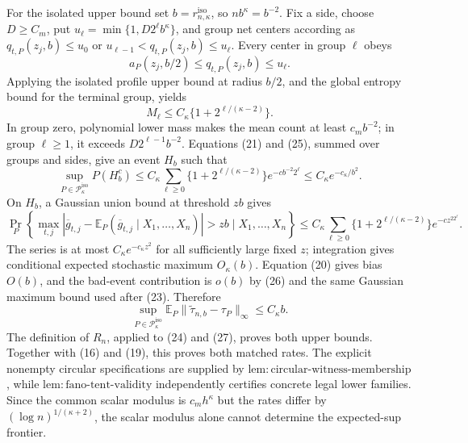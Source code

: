 For the isolated upper bound set \(b=r_{n,\kappa}^{\mathrm{iso}}\), so \(nb^{\kappa}=b^{-2}\).  Fix a side, choose \(D\ge C_m\), put \(u_{\ell}=\min\{1,D2^{\ell}b^{\kappa}\}\), and group net centers according as \(q_{t,P}(z_j,b)\le u_0\) or \(u_{\ell-1}<q_{t,P}(z_j,b)\le u_{\ell}\).  Every center in group \(\ell\) obeys
\[
 a_P(z_j,b/2)\le q_{t,P}(z_j,b)\le u_{\ell}.
\]
Applying the isolated profile upper bound at radius \(b/2\), and the global entropy bound for the terminal group, yields
\[
 M_{\ell}\le C_{\kappa}\{1+2^{\ell/(\kappa-2)}\}. \tag{25}
\]
In group zero, polynomial lower mass makes the mean count at least \(c_mb^{-2}\); in group \(\ell\ge1\), it exceeds \(D2^{\ell-1}b^{-2}\).  Equations (21) and (25), summed over groups and sides, give an event \(H_b\) such that
\[
 \sup_{P\in\mathcal P_{\kappa}^{\mathrm{iso}}}P(H_b^c)
 \le C_{\kappa}\sum_{\ell\ge0}\{1+2^{\ell/(\kappa-2)}\}e^{-cb^{-2}2^{\ell}}
 \le C_{\kappa}e^{-c_{\kappa}/b^2}. \tag{26}
\]
On \(H_b\), a Gaussian union bound at threshold \(zb\) gives
\[
 \Pr_P\left\{
 \max_{t,j}|\overline g_{t,j}-\mathbb E_P(\overline g_{t,j}\mid X_1,\ldots,X_n)|>zb
 \mid X_1,\ldots,X_n\right\}
 \le C_{\kappa}\sum_{\ell\ge0}\{1+2^{\ell/(\kappa-2)}\}e^{-cz^22^{\ell}}.
\]
The series is at most \(C_{\kappa}e^{-c_{\kappa}z^2}\) for all sufficiently large fixed \(z\); integration gives conditional expected stochastic maximum \(O_{\kappa}(b)\).  Equation (20) gives bias \(O(b)\), and the bad-event contribution is \(o(b)\) by (26) and the same Gaussian maximum bound used after (23).  Therefore
\[
 \sup_{P\in\mathcal P_{\kappa}^{\mathrm{iso}}}
 \mathbb E_P\|\widetilde\tau_{n,b}-\tau_P\|_{\infty}
 \le C_{\kappa}b. \tag{27}
\]
The definition of \(R_n\), applied to (24) and (27), proves both upper bounds.  Together with (16) and (19), this proves both matched rates.  The explicit nonempty circular specifications are supplied by \(\mathrm{lem:circular\text{-}witness\text{-}membership}\), while \(\mathrm{lem:fano\text{-}tent\text{-}validity}\) independently certifies concrete legal lower families.  Since the common scalar modulus is \(c_mh^{\kappa}\) but the rates differ by \((\log n)^{1/(\kappa+2)}\), the scalar modulus alone cannot determine the expected-sup frontier.